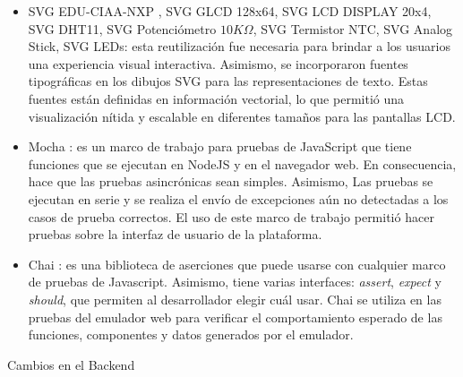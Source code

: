 \begin{itemize}
    \item SVG EDU-CIAA-NXP \citep{SVGFirmwareV3}, SVG GLCD 128x64, SVG LCD DISPLAY 20x4, SVG DHT11, SVG Potenciómetro \(10K\Omega\), SVG Termistor NTC, SVG Analog Stick, SVG LEDs: esta reutilización fue necesaria para brindar a los usuarios una experiencia visual interactiva. Asimismo, se incorporaron fuentes tipográficas en los dibujos SVG para las representaciones de texto. Estas fuentes  están definidas en información vectorial,  lo que permitió una visualización nítida y escalable en diferentes tamaños para las pantallas LCD.

     \item Mocha \citep{Mocha}: es un marco de trabajo para pruebas de JavaScript que tiene funciones que se ejecutan en NodeJS y en el navegador web. En consecuencia, hace que las pruebas asincrónicas sean simples. Asimismo, Las pruebas se ejecutan en serie y se realiza el envío de excepciones aún no detectadas a los casos de prueba correctos.
El uso de este marco de trabajo permitió hacer pruebas sobre la interfaz de usuario de la plataforma.
     
     \item Chai \citep{Chai}: es una biblioteca de aserciones que puede usarse con cualquier marco de pruebas de Javascript. Asimismo, tiene varias interfaces: \textit{assert}, \textit{expect} y \textit{should}, que permiten al desarrollador elegir cuál usar. Chai se utiliza en las pruebas del emulador web para  verificar el comportamiento esperado de las funciones, componentes y datos generados por el emulador. 
\end{itemize}

Cambios en el Backend

